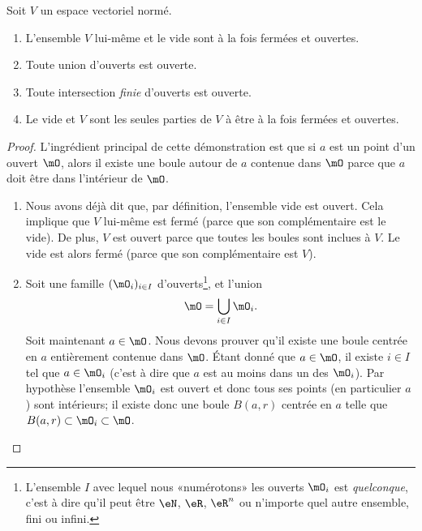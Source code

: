 \begin{proposition}		\label{PropTopologieAx}
	Soit $V$ un espace vectoriel normé.
	\begin{enumerate}
		\item
			L'ensemble $V$ lui-même et le vide sont à la fois fermées et ouvertes.
		\item
			Toute union d'ouverts est ouverte.
		\item
			Toute intersection \emph{finie} d'ouverts est ouverte.
		\item		\label{ItemPropTopologieAxiv}
			Le vide et $V$ sont les seules parties de $V$ à être à la fois fermées et ouvertes.
	\end{enumerate}
\end{proposition}

\begin{proof}
	L'ingrédient principal de cette démonstration est que si $a$ est un point d'un ouvert $\mO$, alors il existe une boule autour de $a$ contenue dans $\mO$ parce que $a$ doit être dans l'intérieur de $\mO$.
	\begin{enumerate}

		\item
			Nous avons déjà dit que, par définition, l'ensemble vide est ouvert. Cela implique que $V$ lui-même est fermé (parce que son complémentaire est le vide). De plus, $V$ est ouvert parce que toutes les boules sont inclues à $V$. Le vide est alors fermé (parce que son complémentaire est $V$).
		\item
			Soit une famille $(\mO_i)_{i\in I}$ d'ouverts\footnote{L'ensemble $I$ avec lequel nous «numérotons» les ouverts $\mO_i$ est \emph{quelconque}, c'est à dire qu'il peut être $\eN$, $\eR$, $\eR^n$ ou n'importe quel autre ensemble, fini ou infini.}, et l'union
			\begin{equation}
				\mO=\bigcup_{i\in I}\mO_i.
			\end{equation}
			Soit maintenant $a\in\mO$. Nous devons prouver qu'il existe une boule centrée en $a$ entièrement contenue dans $\mO$. Étant donné que $a\in\mO$, il existe $i\in I$ tel que $a\in\mO_i$ (c'est à dire que $a$ est au moins dans un des $\mO_i$). Par hypothèse l'ensemble $\mO_i$ est ouvert et donc tous ses points (en particulier $a$) sont intérieurs; il existe donc une boule $B(a,r)$ centrée en $a$ telle que $B(a,r)\subset\mO_i\subset\mO$.
		

\end{enumerate}
\end{proof}
